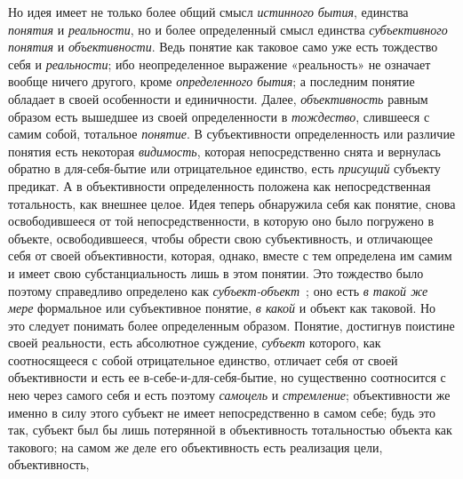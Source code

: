 \documentclass[twoside]{article}
\begin{document}
{{{Но идея имеет не только более общий смысл
{\em истинного}
{\em бытия}, единства
{\em понятия} и
{\em реальности}, но и
более определенный смысл единства
{\em субъективного понятия}
и {\em объективности}.
Ведь понятие как таковое само уже есть тождество себя и
{\em реальности}; ибо
неопределенное выражение «реальность» не означает вообще ничего другого,
кроме {\em определенного бытия};
а последним понятие обладает в своей особенности и
единичности. Далее, {\em объективность}
равным образом есть вышедшее из своей определенности в
{\em тождество},
слившееся с самим собой, тотальное
{\em понятие}. В
субъективности определенность или различие понятия есть некоторая
{\em видимость}, которая
непосредственно снята и вернулась обратно в для-себя-бытие или
отрицательное единство, есть
{\em присущий} субъекту
предикат. А в объективности определенность положена как непосредственная
тотальность, как внешнее целое. Идея теперь обнаружила себя как понятие,
снова освободившееся от той непосредственности, в которую оно было
погружено в объекте, освободившееся, чтобы обрести свою субъективность, и
отличающее себя от своей объективности, которая, однако, вместе с тем
определена им самим и имеет свою субстанциальность лишь в этом понятии. Это
тождество было поэтому справедливо определено как
{\em субъект-объект}~\label{bkm:bm90};
оно есть {\em в такой же
мере} формальное или субъективное понятие,
{\em в какой} и объект
как таковой. Но это следует понимать более определенным образом. Понятие,
достигнув поистине своей реальности, есть абсолютное суждение,
{\em субъект} которого,
как соотносящееся с собой отрицательное единство, отличает
себя от своей объективности и есть ее в-себе-и-для-себя-бытие, но
существенно соотносится с нею через самого себя и есть поэтому
{\em самоцель} и
{\em стремление};
объективности же именно в силу этого субъект не имеет
непосредственно в самом себе; будь это так, субъект был бы лишь потерянной
в объективность тотальностью объекта как такового; на самом же деле его
объективность есть реализация цели, объективность,
}}}
\end{document}
